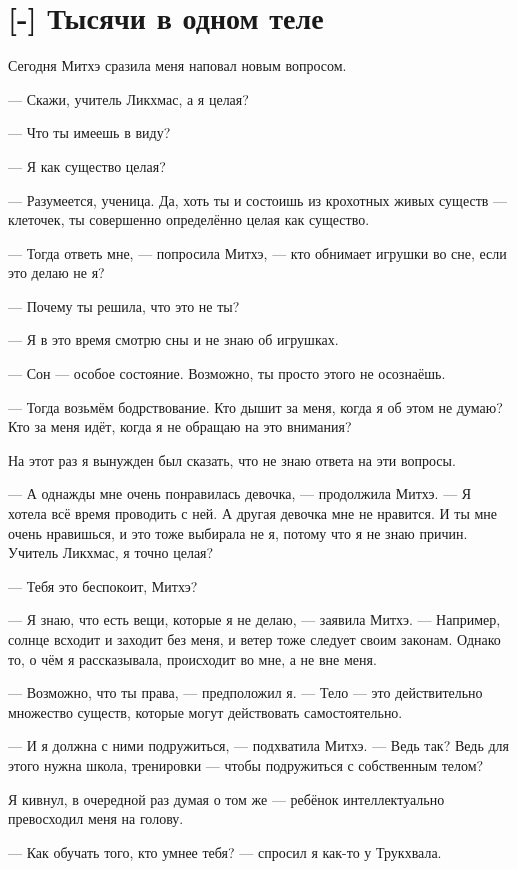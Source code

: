 \section{[-] Тысячи в одном теле}

Сегодня Митхэ сразила меня наповал новым вопросом.

--- Скажи, учитель Ликхмас, а я целая?

--- Что ты имеешь в виду?

--- Я как существо целая?

--- Разумеется, ученица.
Да, хоть ты и состоишь из крохотных живых существ --- клеточек, ты совершенно определённо целая как существо.

--- Тогда ответь мне, --- попросила Митхэ, --- кто обнимает игрушки во сне, если это делаю не я?

--- Почему ты решила, что это не ты?

--- Я в это время смотрю сны и не знаю об игрушках.

--- Сон --- особое состояние.
Возможно, ты просто этого не осознаёшь.

--- Тогда возьмём бодрствование.
Кто дышит за меня, когда я об этом не думаю?
Кто за меня идёт, когда я не обращаю на это внимания?

На этот раз я вынужден был сказать, что не знаю ответа на эти вопросы.

--- А однажды мне очень понравилась девочка, --- продолжила Митхэ.
--- Я хотела всё время проводить с ней.
А другая девочка мне не нравится.
И ты мне очень нравишься, и это тоже выбирала не я, потому что я не знаю причин.
Учитель Ликхмас, я точно целая?

--- Тебя это беспокоит, Митхэ?

--- Я знаю, что есть вещи, которые я не делаю, --- заявила Митхэ.
--- Например, солнце всходит и заходит без меня, и ветер тоже следует своим законам.
Однако то, о чём я рассказывала, происходит во мне, а не вне меня.

--- Возможно, что ты права, --- предположил я.
--- Тело --- это действительно множество существ, которые могут действовать самостоятельно.

--- И я должна с ними подружиться, --- подхватила Митхэ.
--- Ведь так?
Ведь для этого нужна школа, тренировки --- чтобы подружиться с собственным телом?

Я кивнул, в очередной раз думая о том же --- ребёнок интеллектуально превосходил меня на голову.

--- Как обучать того, кто умнее тебя? --- спросил я как-то у Трукхвала.

